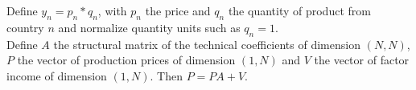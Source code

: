 \documentclass[11pt,a4paper]{article}
\begin{document}
Define $y_n=p_n*q_n$, with $p_n$ the price and $q_n$ the quantity of product from country $n$ and normalize quantity units such as $q_n=1$. \\
Define $A$ the structural matrix of the technical coefficients of dimension $(N, N)$, $P$ the vector of production prices of dimension $(1, N)$ and $V$ the vector of factor income of dimension $(1, N)$. Then $P=PA+V$. \\


\end{document}
